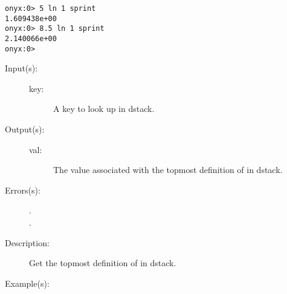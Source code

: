 \begin{description}
\begin{description}
\begin{verbatim}
onyx:0> 5 ln 1 sprint
1.609438e+00
onyx:0> 8.5 ln 1 sprint
2.140066e+00
onyx:0>
		\end{verbatim}
	\end{description}
\label{systemdict:load}
\item[{\onyxop{key}{load}{val}}: ]
	\begin{description}\item[]
	\item[Input(s): ]
		\begin{description}\item[]
		\item[key: ]
			A key to look up in dstack.
		\end{description}
	\item[Output(s): ]
		\begin{description}\item[]
		\item[val: ]
			The value associated with the topmost definition of
			 in dstack.
		\end{description}
	\item[Errors(s): ]
		\begin{description}\item[]
		\item[.]
		\item[.]
		\end{description}
	\item[Description: ]
		Get the topmost definition of  in dstack.
	\item[Example(s): ]\begin{verbatim}


\end{verbatim}
\end{description}
\end{description}
